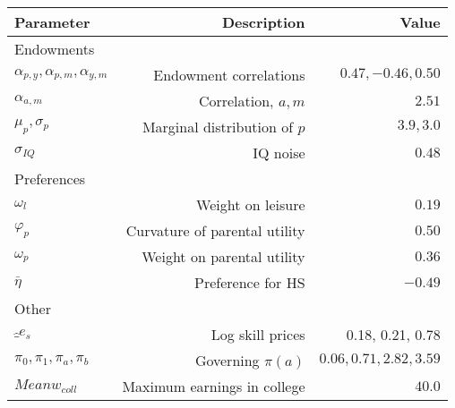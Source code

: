 \begin{tabular}{lrr}
\hline
Parameter & Description  & Value  \\
\hline
Endowments &   &   \\
$\alpha_{p,y}, \alpha_{p,m}, \alpha_{y,m}$ & Endowment correlations  & $0.47, -0.46, 0.50$  \\
$\alpha_{a,m}$ & Correlation, $a,m$  & $2.51$  \\
$\mu_{p}, \sigma_{p}$ & Marginal distribution of $p$  & $3.9, 3.0$  \\
$\sigma_{IQ}$ & IQ noise  & $0.48$  \\
Preferences &   &   \\
$\omega_{l}$ & Weight on leisure  & $0.19$  \\
$\varphi_{p}$ & Curvature of parental utility  & $0.50$  \\
$\omega_{p}$ & Weight on parental utility  & $0.36$  \\
$\bar{\eta}$ & Preference for HS  & $-0.49$  \\
Other &   &   \\
$\hat_{e}_{s}$ & Log skill prices  & 0.18, 0.21, 0.78  \\
$\pi_{0}, \pi_{1}, \pi_{a}, \pi_{b}$ & Governing $\pi(a)$  & $0.06, 0.71, 2.82, 3.59$  \\
$Mean w_{coll}$ & Maximum earnings in college  & $40.0$  \\
\hline
\end{tabular}%
